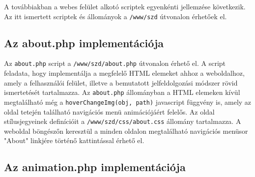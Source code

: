 \documentclass[oneside,titlepage,12pt,a4paper]{report}
\begin{document}
A továbbiakban a webes felület alkotó scriptek egyenkénti jellemzése következik. Az itt ismertett scriptek és állományok a \texttt{/www/szd} útvonalon érhetőek el. 

\subsection{Az about.php implementációja}

Az \texttt{about.php} script a \texttt{/www/szd/about.php} útvonalon érhető el. A script feladata, hogy implementálja a megfelelő HTML elemeket ahhoz a weboldalhoz, amely a felhasználói felület, illetve a bemutatott jelfeldolgozási módszer rövid ismertetését tartalmazza. Az \texttt{about.php} állományban a HTML elemeken kívül megtalálható még a \texttt{hoverChangeImg(obj, path)} javascript függvény is, amely az oldal tetején található navigációs menü animációjáért felelős. Az oldal stílusjegyeinek definícióit a \texttt{/www/szd/css/about.css} állomány tartalmazza. A weboldal böngészőn keresztül a minden oldalon megtalálható navigációs menüsor "About" linkjére történő kattintással érhető el.

\subsection{Az animation.php implementációja}
\end{document}
